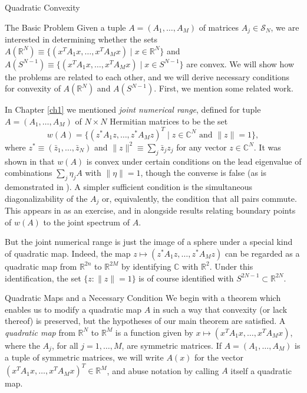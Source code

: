\documentclass[12pt,oneside,final]{ucthesisucsbmath2010}
\newcommand{\R}{\mathbb{R}}
\newcommand{\C}{\mathbb{C}}
\newcommand{\s}{\mathcal{S}}
\theoremstyle{definition}
\begin{document}
\begin{chapter}{Quadratic Convexity}
\begin{section}{The Basic Problem}
Given a tuple $A=(A_1,\ldots,A_M)$ of matrices $A_j \in \s_N$, we are interested in determining whether the sets $A(\R^N) \equiv \{(x^TA_1x,\ldots,x^TA_Mx) \mid x\in \R^N\}$ and 
$A(S^{N-1}) \equiv \{(x^TA_1x,\ldots,x^TA_Mx) \mid x\in S^{N-1}\}$ are convex. We will show how the problems are related to each other, and we will derive necessary conditions for convexity of $A(\R^N)$ and $A(S^{N-1})$. First, we mention some related work.

In Chapter \ref{ch1} we mentioned \emph{joint numerical range}, defined for tuple $A=(A_1,\ldots,A_M)$ of $N\times N$ Hermitian matrices to be the set
\[w(A) = \{(z^*A_1z,\ldots,z^*A_Mz)^T\mid z\in \C^N \text{ and } \|z\|=1\},\]
where $z^*\equiv (\bar z_1,\ldots,\bar z_N)$ and $\|z\|^2 \equiv \sum_j \bar z_j z_j$ for any vector $z \in \C^N$. It was shown in \cite{Gut1} that $w(A)$ is convex under certain conditions on the lead eigenvalue of combinations $\sum_j \eta_j A$ with $\|\eta\| =1$, though the converse is false (as is demonstrated in \cite{Gut1}). A simpler sufficient condition is the simultaneous diagonalizability of the $A_j$ or, equivalently, the condition that all pairs commute. This appears in \cite{Barvinok} as an exercise, and in \cite{BindingLi} alongside results relating boundary points of $w(A)$ to the joint spectrum of $A$. 

But the joint numerical range is just the image of a sphere under a special kind of quadratic map. Indeed, the map $z \mapsto (z^* A_1 z, \ldots, z^* A_M z)$
can be regarded as a quadratic map from $\R^{2n}$ to $\R^{2M}$ by identifying $\C$ with $\R^2$. Under this identification, the set $\{z : \|z\| = 1\}$ is of course identified with $S^{2N-1} \subset \R^{2N}$.
\end{section}

\begin{section}{Quadratic Maps and a Necessary Condition}
We begin with a theorem which enables us to modify a quadratic map $A$ in such a way that convexity (or lack thereof) is preserved, but the hypotheses of our main theorem are satisfied. A \emph{quadratic map} from $\R^N$ to $\R^M$ is a function given by $x \mapsto (x^TA_1x,\ldots,x^TA_Mx)$, where the $A_j$, for all $j = 1,\ldots,M$, are symmetric matrices. If $A=(A_1,\ldots,A_M)$ is a tuple of symmetric matrices, we will write $A(x)$ for the vector $(x^TA_1x,\ldots,x^TA_Mx)^T\in \R^M$, and abuse notation by calling $A$ itself a quadratic map.


\end{section}
\end{chapter}
\end{document}
